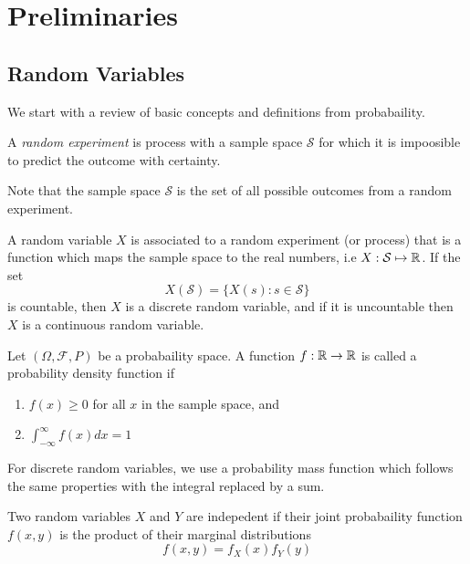 \chapter{Preliminaries}

\section{Random Variables}

We start with a review of basic concepts and definitions from probabaility.

\begin{definition}
    A \emph{random experiment} is process with a sample space $\mathcal{S}$ for which it is impoosible to predict the outcome with certainty.
\end{definition}
Note that the sample space $\mathcal{S}$ is the set of all possible outcomes from a random experiment. 
\begin{definition}
    A random variable $X$ is associated to a random experiment (or process) that is a function which maps the sample space to the real numbers, i.e $X: \mathcal{S} \mapsto \mathbb{R}$. If the set 
    \[X(\mathcal{S}) = \{X(s) : s \in \mathcal{S}\}\]
    is countable, then $X$ is a discrete random variable, and if it is uncountable then $X$ is a continuous random variable.
\end{definition}

\begin{definition}

    Let $(\Omega, \mathcal{F}, P)$ be a probabaility space. A function $f:\mathbb{R} \rightarrow \mathbb{R}$ is called a probability density function if 
    \begin{enumerate}
        \item $f(x) \geq 0$  for all $x$ in the sample space, and 
        \item $\int_{-\infty}^{\infty} f(x)dx = 1$
    \end{enumerate}
    For discrete random variables, we use a probability mass function which follows the same properties with the integral replaced by a sum.
\end{definition}

\begin{theorem}
    Two random variables $X$ and $Y$ are indepedent if their joint probabaility function $f(x,y)$ is the product of their marginal distributions 
    \[f(x,y) = f_X(x)f_Y(y)\]
\end{theorem}

